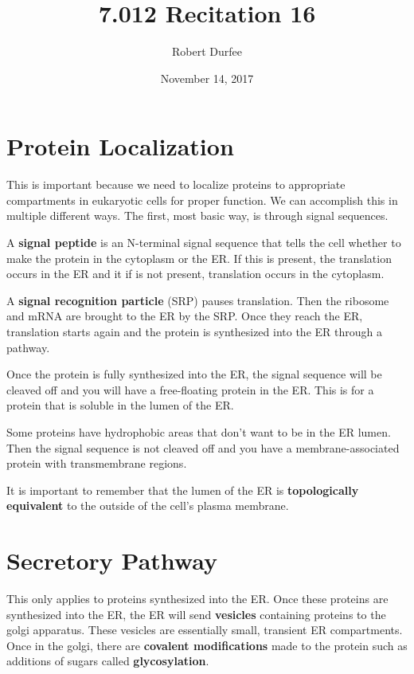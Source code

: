 \documentclass{article}
\title{ 7.012 Recitation 16 }
\author{ Robert Durfee }
\date{ November 14, 2017 }
\begin{document}
\maketitle

\section{ Protein Localization }

This is important because we need to localize proteins to appropriate
compartments in eukaryotic cells for proper function. We can accomplish this in
multiple different ways. The first, most basic way, is through signal sequences. 

A \textbf{signal peptide} is an N-terminal signal sequence that tells the cell
whether to make the protein in the cytoplasm or the ER. If this is present, the
translation occurs in the ER and it if is not present, translation occurs in the
cytoplasm.

A \textbf{signal recognition particle} (SRP) pauses translation. Then the
ribosome and mRNA are brought to the ER by the SRP. Once they reach the ER,
translation starts again and the protein is synthesized into the ER through a
pathway.

Once the protein is fully synthesized into the ER, the signal sequence will be
cleaved off and you will have a free-floating protein in the ER. This is for a
protein that is soluble in the lumen of the ER.

Some proteins have hydrophobic areas that don't want to be in the ER lumen. Then
the signal sequence is not cleaved off and you have a membrane-associated 
protein with transmembrane regions.

It is important to remember that the lumen of the ER is \textbf{topologically
equivalent} to the outside of the cell's plasma membrane. 

\section{Secretory Pathway}

This only applies to proteins synthesized into the ER. Once these proteins are
synthesized into the ER, the ER will send \textbf{vesicles} containing proteins
to the golgi apparatus. These vesicles are essentially small, transient ER
compartments. Once in the golgi, there are \textbf{covalent modifications} made
to the protein such as additions of sugars called \textbf{glycosylation}.
\end{document}
